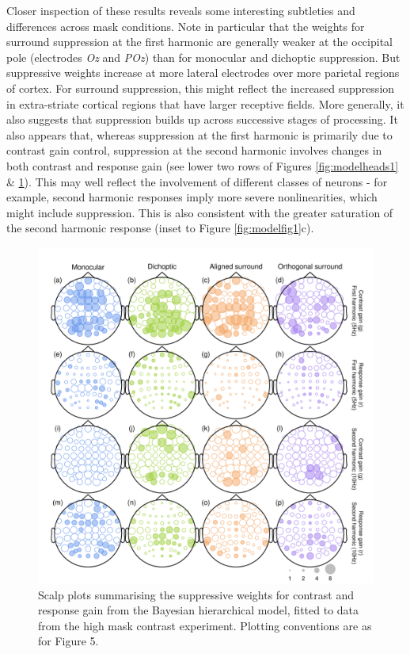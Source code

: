 \documentclass[]{article}
\begin{document}
Closer inspection of these results reveals some interesting subtleties and differences across mask conditions. Note in particular that the weights for surround suppression at the first harmonic are generally weaker at the occipital pole (electrodes \emph{Oz} and \emph{POz}) than for monocular and dichoptic suppression. But suppressive weights increase at more lateral electrodes over more parietal regions of cortex. For surround suppression, this might reflect the increased suppression in extra-striate cortical regions that have larger receptive fields. More generally, it also suggests that suppression builds up across successive stages of processing. It also appears that, whereas suppression at the first harmonic is primarily due to contrast gain control, suppression at the second harmonic involves changes in both contrast and response gain (see lower two rows of Figures \ref{fig:modelheads1} \& \ref{fig:modelheads2}). This may well reflect the involvement of different classes of neurons - for example, second harmonic responses imply more severe nonlinearities, which might include suppression. This is also consistent with the greater saturation of the second harmonic response (inset to Figure \ref{fig:modelfig1}c).

\begin{figure}

{\centering \includegraphics{figures/modelheads2} 

}

\caption{Scalp plots summarising the suppressive weights for contrast and response gain from the Bayesian hierarchical model, fitted to data from the high mask contrast experiment. Plotting conventions are as for Figure 5.}\label{fig:modelheads2}
\end{figure}
\end{document}

